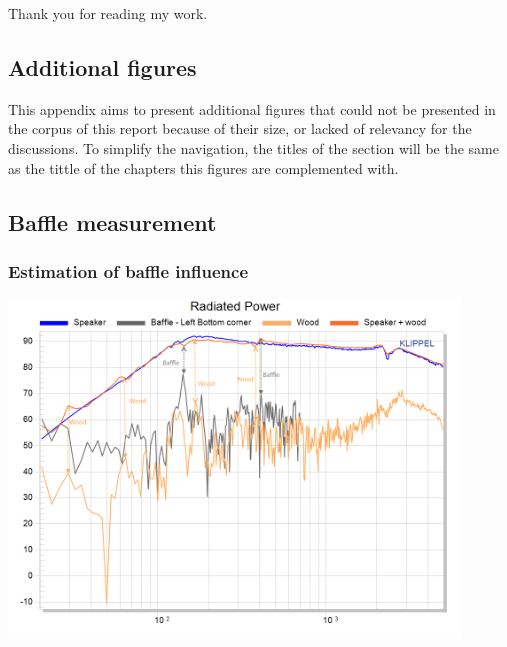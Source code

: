 \documentclass{report}
\begin{document}
Thank you for reading my work.

\renewcommand{\bibname}{References}



\nocite{*}


\begin{appendices}

\chapter{Additional figures}
This appendix aims to present additional figures that could not be presented in the corpus of this report because of their size, or lacked of relevancy for the discussions. To simplify the navigation, the titles of the section will be the same as the tittle of the chapters this figures are complemented with. 


\section{Baffle measurement}
\subsection{Estimation of baffle influence}
\label{Curves:BaffleInfluence}

\begin{center}
	\includegraphics[width=0.9\textwidth]{Appendix/Vib_RadPow}
    \captionsetup{hypcap=false}
    \label{Curves:Baffle_RadPow}
\end{center}



\end{appendices}
\end{document}
